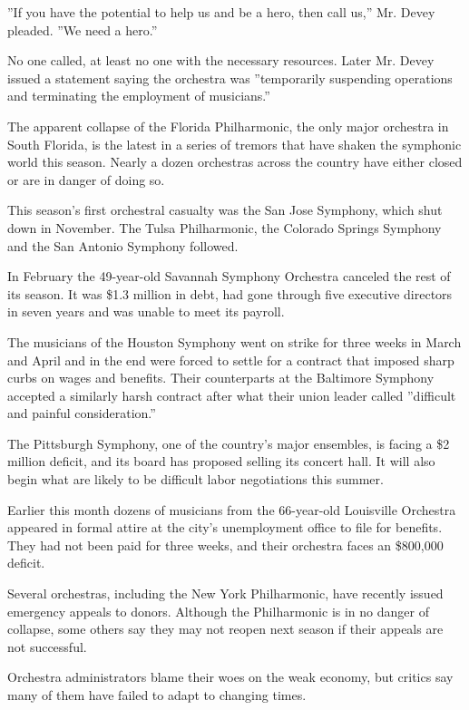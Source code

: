 ''If you have the potential to help us and be a hero, then call us,''
Mr. Devey pleaded. ''We need a hero.''

No one called, at least no one with the necessary resources. Later Mr.
Devey issued a statement saying the orchestra was ''temporarily
suspending operations and terminating the employment of musicians.''

The apparent collapse of the Florida Philharmonic, the only major
orchestra in South Florida, is the latest in a series of tremors that
have shaken the symphonic world this season. Nearly a dozen orchestras
across the country have either closed or are in danger of doing so.

This season's first orchestral casualty was the San Jose Symphony, which
shut down in November. The Tulsa Philharmonic, the Colorado Springs
Symphony and the San Antonio Symphony followed.

In February the 49-year-old Savannah Symphony Orchestra canceled the
rest of its season. It was \$1.3 million in debt, had gone through five
executive directors in seven years and was unable to meet its payroll.

The musicians of the Houston Symphony went on strike for three weeks in
March and April and in the end were forced to settle for a contract that
imposed sharp curbs on wages and benefits. Their counterparts at the
Baltimore Symphony accepted a similarly harsh contract after what their
union leader called ''difficult and painful consideration.''

The Pittsburgh Symphony, one of the country's major ensembles, is facing
a \$2 million deficit, and its board has proposed selling its concert
hall. It will also begin what are likely to be difficult labor
negotiations this summer.

Earlier this month dozens of musicians from the 66-year-old Louisville
Orchestra appeared in formal attire at the city's unemployment office to
file for benefits. They had not been paid for three weeks, and their
orchestra faces an \$800,000 deficit.

Several orchestras, including the New York Philharmonic, have recently
issued emergency appeals to donors. Although the Philharmonic is in no
danger of collapse, some others say they may not reopen next season if
their appeals are not successful.

Orchestra administrators blame their woes on the weak economy, but
critics say many of them have failed to adapt to changing times.

